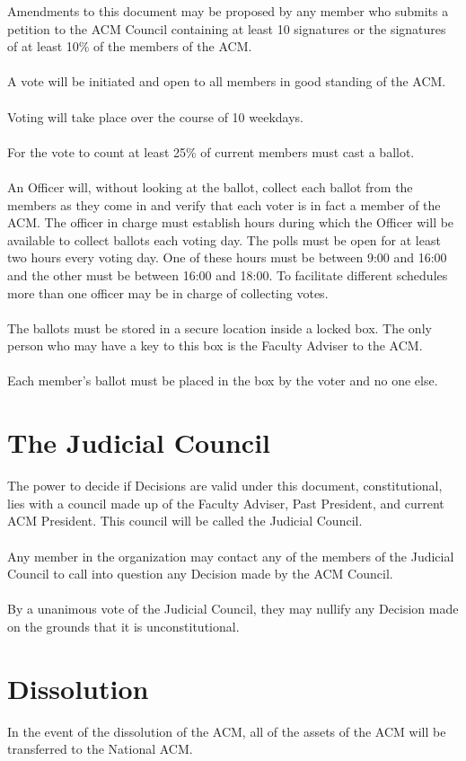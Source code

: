 \documentclass[12pt,titlepage]{article}
\begin{document}
Amendments to this document may be proposed by any member who submits a petition to the ACM Council containing at least 10 signatures or the signatures of at least 10\% of the members of the ACM.\\
\\
A vote will be initiated and open to all members in good standing of the ACM.\\
\\
Voting will take place over the course of 10 weekdays.\\
\\
For the vote to count at least 25\% of current members must cast a ballot.\\
\\
An Officer will, without looking at the ballot, collect each ballot from the members as they come in and verify that each voter is in fact a member of the ACM. The officer in charge must establish hours during which the Officer will be available to collect ballots each voting day. The polls must be open for at least two hours every voting day. One of these hours must be between 9:00 and 16:00 and the other must be between 16:00 and 18:00. To facilitate different schedules more than one officer may be in charge of collecting votes.\\
\\
The ballots must be stored in a secure location inside a locked box. The only person who may have a key to this box is the Faculty Adviser to the ACM.\\
\\
Each member's ballot must be placed in the box by the voter and no one else.

\section{The Judicial Council}

The power to decide if Decisions are valid under this document, constitutional, lies with a council made up of the Faculty Adviser, Past President, and current ACM President. This council will be called the Judicial Council.\\
\\
Any member in the organization may contact any of the members of the Judicial Council to call into question any Decision made by the ACM Council.\\
\\
By a unanimous vote of the Judicial Council, they may nullify any Decision made on the grounds that it is unconstitutional.

\section{Dissolution}

In the event of the dissolution of the ACM, all of the assets of the ACM will be transferred to the National ACM.
\end{document}
